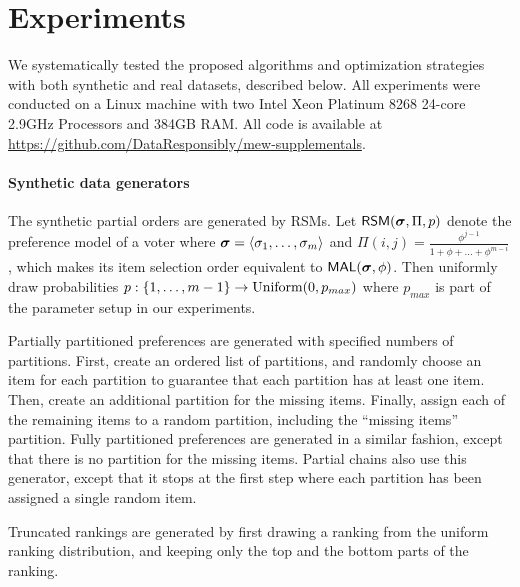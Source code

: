 \section{Experiments}
\label{sec:exp}

We systematically tested the proposed algorithms and optimization strategies with both synthetic and real datasets, described below. All experiments were conducted on a Linux machine with two Intel Xeon Platinum 8268 24-core 2.9GHz Processors and 384GB RAM.  All code is available at \url{https://github.com/DataResponsibly/mew-supplementals}. 

\paragraph{Synthetic data generators}

The synthetic partial orders are generated by RSMs.
Let $\mathsf{RSM}(\bm{\sigma}, \Pi, p)$ denote the preference model of a voter where $\bm{\sigma} = \langle \sigma_1, \ldots, \sigma_{m} \rangle$ and $\Pi(i, j) = \frac{\phi^{j-1}}{1+\phi+...+\phi^{m-i}}$, which makes its item selection order equivalent to $\mathsf{MAL}(\bm{\sigma}, \phi)$.
Then uniformly draw probabilities $p: \{ 1, \ldots, m-1 \} \rightarrow \text{Uniform}(0, p_{max})$ where $p_{max}$ is part of the parameter setup in our experiments.

Partially partitioned preferences are generated with specified numbers of partitions. First, create an ordered list of partitions, and randomly choose an item for each partition to guarantee that each partition has at least one item. Then, create an additional partition for the missing items. Finally, assign each of the remaining items to a random partition, including the ``missing items'' partition.  Fully partitioned preferences are generated in a similar fashion, except that there is no partition for the missing items. Partial chains also use this generator, except that it stops at the first step where each partition has been assigned a single random item.

Truncated rankings are generated by first drawing a ranking from the uniform ranking distribution, and keeping only the top and the bottom parts of the ranking.

